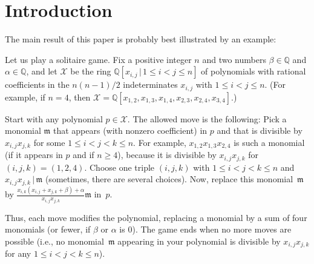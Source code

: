 \documentclass[pdftex]{sigma}
\numberwithin{equation}{section}
\begin{document}
\tableofcontents

\section{Introduction}

The main result of this paper is probably best illustrated by an example:

\begin{Example}
\label{exam.intro}Let us play a solitaire game. Fix a positive integer $n$ and two numbers $\beta\in\mathbb{Q}$ and $\alpha\in\mathbb{Q}$, and let $\mathcal{X}$ be the ring $\mathbb{Q} [ x_{i,j}\,|\, 1\leq i<j\leq n ] $ of polynomials with rational coefficients in the $n(n-1) /2$ indeterminates $x_{i,j}$ with $1\leq i<j\leq n$. (For example, if $n=4$, then $\mathcal{X}=\mathbb{Q} [ x_{1,2},x_{1,3},x_{1,4},x_{2,3},x_{2,4},x_{3,4}] $.)

Start with any polynomial $p\in\mathcal{X}$. The allowed move is the following: Pick a monomial $\mathfrak{m}$ that appears (with nonzero coefficient) in $p$ and that is divisible by $x_{i,j}x_{j,k}$ for some $1\leq i<j<k\leq n$. For example, $x_{1,2}x_{1,3}x_{2,4}$ is such a monomial (if it appears in $p$ and if $n\geq4$), because it is divisible by $x_{i,j}x_{j,k}$ for $( i,j,k) =( 1,2,4) $. Choose one triple $(i,j,k) $ with $1\leq i<j<k\leq n$ and $x_{i,j}x_{j,k} \,|\, \mathfrak{m}$ (sometimes, there are several choices). Now, replace this monomial~$\mathfrak{m}$ by $\frac{x_{i,k}( x_{i,j}+x_{j,k}+\beta) +\alpha}{x_{i,j}x_{j,k}}\mathfrak{m}$ in~$p$.

Thus, each move modifies the polynomial, replacing a monomial by a sum of four monomials (or fewer, if $\beta$ or $\alpha$ is $0$). The game ends when no more moves are possible (i.e., no mono\-mial~$\mathfrak{m}$ appearing in your polynomial is divisible by $x_{i,j}x_{j,k}$ for any $1\leq i<j<k\leq n$).


\end{Example}
\end{document}
